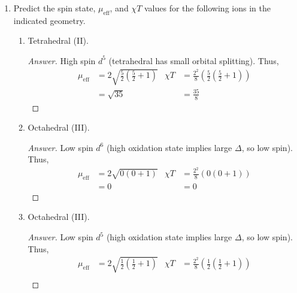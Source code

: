 \documentclass[../psets.tex]{subfiles}
\begin{document}
\begin{enumerate}
\begin{enumerate}[label={\alph*)}]
\begin{proof}[Answer]
\begin{center}
                    \arrow{<->}
                    \arrow{<->}
                \schemestop
            \end{center}
            2-electron donor.\par
            -type ligand.
        \end{proof}
    \end{enumerate}
    \item Predict the spin state, $\mu_\text{eff}$, and $\chi T$ values for the following ions in the indicated geometry.
    \begin{enumerate}[label={\alph*)}]
        \item Tetrahedral (II).
        \begin{proof}[Answer]
            High spin $d^5$ (tetrahedral has small orbital splitting). Thus,
            \begin{align*}
                \mu_\text{eff} &= 2\sqrt{\frac{5}{2}\left( \frac{5}{2}+1 \right)}&
                    \chi T &= \frac{2^2}{8}\left( \frac{5}{2}\left( \frac{5}{2}+1 \right) \right)\\
                &= \sqrt{35}&
                    &= \frac{35}{8}
            \end{align*}
        \end{proof}
        \item Octahedral (III).
        \begin{proof}[Answer]
            Low spin $d^6$ (high oxidation state implies large $\Delta$, so low spin). Thus,
            \begin{align*}
                \mu_\text{eff} &= 2\sqrt{0(0+1)}&
                    \chi T &= \frac{2^2}{8}(0(0+1))\\
                &= 0&
                    &= 0
            \end{align*}
        \end{proof}
        \item Octahedral (III).
        \begin{proof}[Answer]
            Low spin $d^5$ (high oxidation state implies large $\Delta$, so low spin). Thus,
            \begin{align*}
                \mu_\text{eff} &= 2\sqrt{\frac{1}{2}\left( \frac{1}{2}+1 \right)}&
                    \chi T &= \frac{2^2}{8}\left( \frac{1}{2}\left( \frac{1}{2}+1 \right) \right)\\

\end{align*}
\end{proof}
\end{enumerate}
\end{enumerate}
\end{document}
